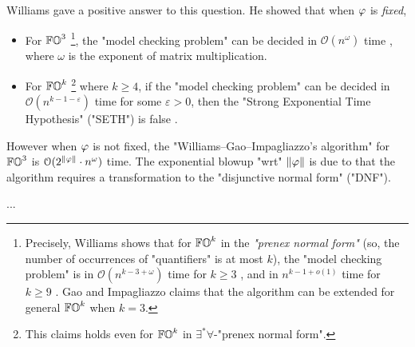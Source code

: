 Williams \cite{williamsFasterDecisionFirstorder2014} gave a positive answer to this question.
He showed that when $\fml$ is \emph{fixed},
\begin{itemize}
    \item For $\mathbb{FO}^{3}$ \footnote{Precisely, Williams \cite{williamsFasterDecisionFirstorder2014} shows that for $\mathbb{FO}^{k}$  in the \emph{"prenex normal form"} (so, the number of occurrences of "quantifiers" is at most $k$),
    the "model checking problem" is in $\mathcal{O}(n^{k - 3 + \omega})$ time for $k \ge 3$ \cite[Corollary 1.3]{williamsFasterDecisionFirstorder2014},
    and in $n^{k-1 + o(1)}$ time for $k \ge 9$ \cite[Theorem 1.3]{williamsFasterDecisionFirstorder2014}.
    Gao and Impagliazzo \cite[Theorem 7]{gaoFineGrainedComplexityStrengthenings2019} claims that
    the algorithm can be extended for general $\mathbb{FO}^{k}$  when $k = 3$.},
    the "model checking problem" can be decided in $\mathcal{O}(n^{\omega})$ time \cite[Theorem 1.2]{williamsFasterDecisionFirstorder2014}\cite[Theorem 7]{gaoFineGrainedComplexityStrengthenings2019},
    where $\omega$ is the exponent of matrix multiplication.%
    
    \item For $\mathbb{FO}^{k}$ \footnote{This claims holds even for $\mathbb{FO}^{k}$  in $\exists^{*} \forall$-"prenex normal form".} where $k \ge 4$,
    if the "model checking problem" can be decided in $\mathcal{O}(n^{k-1-\varepsilon})$ time for some $\varepsilon > 0$,
    then the "Strong Exponential Time Hypothesis" ("SETH") is false \cite[Corollary 1.4]{williamsFasterDecisionFirstorder2014}.
\end{itemize}

However when $\fml$ is not fixed,
the "Williams--Gao--Impagliazzo's algorithm" \cite{williamsFasterDecisionFirstorder2014,gaoFineGrainedComplexityStrengthenings2019} for $\mathbb{FO}^{3}$  is $\mathcal{O}(2^{\len{\fml}} \cdot n^{\omega})$ time.
The exponential blowup "wrt" $\len{\fml}$ is due to that the algorithm requires a transformation to the "disjunctive normal form" ("DNF").

...

